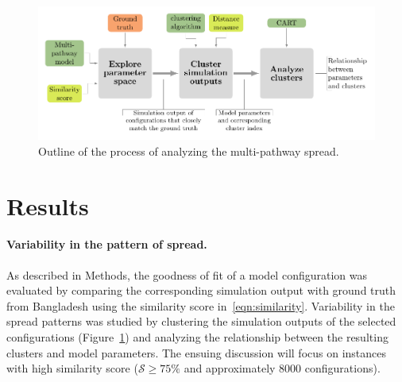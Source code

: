 \documentclass[11pt]{article}
\newcommand{\tuta}{\emph{T.~absoluta}}
\newcommand{\similarity}{\mathcal{S}}
\theoremstyle{definition}
\begin{document}
\begin{figure}[htb]
    \centering
    \includegraphics[width=.8\textwidth]{figs/spread_analysis.pdf}
    \caption{Outline of the process of analyzing the multi-pathway spread. \label{fig:clusterOutline}}
\end{figure}
\section{Results}
\paragraph{Variability in the pattern of spread.}
As described in Methods, the goodness of fit of a model configuration was
evaluated by comparing the corresponding simulation output with ground
truth from Bangladesh using the similarity score in~\eqref{eqn:similarity}.
Variability in the spread patterns was studied by clustering the simulation
outputs of the selected configurations (Figure~\ref{fig:clusterOutline})
and analyzing the relationship between the resulting clusters and model
parameters. The ensuing discussion will focus on instances with high
similarity score ($\similarity\ge75\%$ and approximately 8000
configurations).
\end{document}
